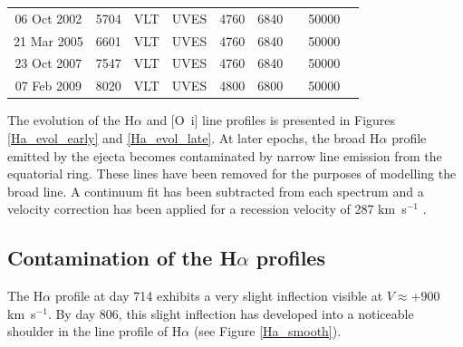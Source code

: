 \documentclass[useAMS,usenatbib,usegraphicx]{mnras}
\begin{document}
\begin{table}
\begin{minipage}{180mm}
\begin{tabular}{@{} ccccccccl @{}}
06 Oct 2002 & 5704 & VLT & UVES & 4760 & 6840 &  & 50000 & \citet{Groeningsson2006, Groeningsson2007, Groningsson2008}\\
21 Mar 2005 & 6601 & VLT & UVES & 4760 & 6840 &  & 50000 &\citet{Groeningsson2006, Groeningsson2007}\\
23 Oct 2007 & 7547 & VLT & UVES & 4760 & 6840 &  & 50000 & \citet{Groeningsson2007}\\
07 Feb 2009 & 8020 & VLT & UVES & 4800 & 6800 &  & 50000 & \citet{Tziamtzis2010}\\
    \hline
  \end{tabular}
\end{minipage}
\end{table}


The evolution of the H$\alpha$ and [O~{\sc i}] line profiles is presented in Figures 
\ref{Ha_evol_early} and \ref{Ha_evol_late}.  At later epochs, the broad H$\alpha$ profile emitted by the ejecta becomes contaminated by narrow line emission 
from the equatorial ring.  These lines have been removed for the purposes 
of modelling the broad line. A continuum fit has been subtracted from each 
spectrum and a velocity correction has been applied for a recession 
velocity of 287 km~s$^{-1}$ \citep{Groningsson2008}.


\subsection{Contamination of the H$\alpha$ profiles}


The H$\alpha$ profile at day 714 exhibits a very slight inflection visible at $V \approx +900$ km~s$^{-1}$.  By day 806, this slight inflection has developed into a noticeable shoulder in the line profile of H$\alpha$ (see Figure \ref{Ha_smooth}).
\end{document}
